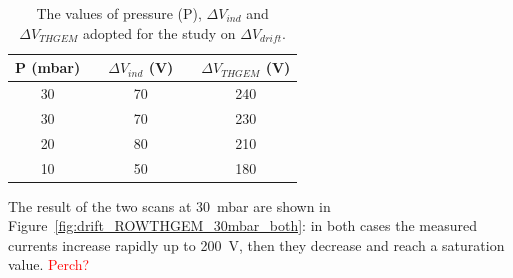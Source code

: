 \documentclass[a4paper, 11 pt]{article}
\newcommand{\Vind}{$\Delta V_{ind}$}
\newcommand{\Vthgem}{$\Delta V_{THGEM}$}
\newcommand{\Vdrift}{$ \Delta V_{drift}$}
\begin{document}
\begin{table} [!h]
	\begin{center}
		\renewcommand{\arraystretch}{1.2}
		\begin{tabular} {ccccc}
			P (mbar) & & \Vind{} (V) & & \Vthgem{} (V)\\
			\toprule[0.1em]
			30	& &	70	& &	240 \\
			30	& &	70	& & 230 \\
			20	& & 80	& & 210 \\
			10	& & 50	& & 180 \\
			
			\bottomrule[0.1em]
		\end{tabular}
	\end{center}
	\caption{The values of pressure (P), \Vind{} and \Vthgem{} adopted for the study on \Vdrift.} \label{tab:ROWTHGEM_vdrift}
\end{table}


The result of the two scans at 30~mbar are shown in Figure~\ref{fig:drift_ROWTHGEM_30mbar_both}: in both cases the measured currents increase rapidly up to 200~V, then they decrease and reach a saturation value. 
\textcolor{red}{Perch?}
\end{document}
